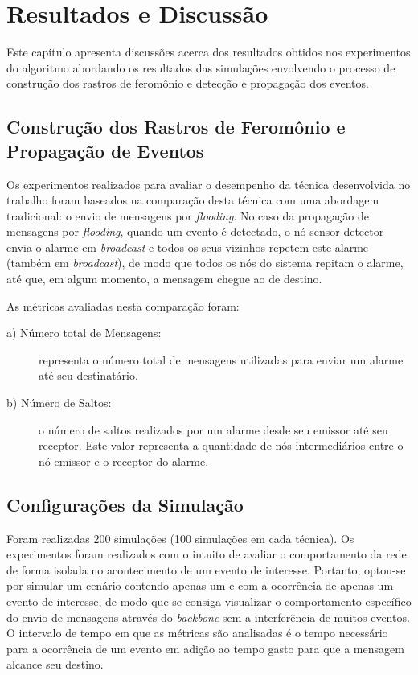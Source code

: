 \newpage\section{Resultados e Discussão}
\label{chap:Resultados}

Este capítulo apresenta discussões acerca dos resultados obtidos nos experimentos do algoritmo abordando os resultados das simulações envolvendo o processo de construção dos rastros de feromônio e detecção e propagação dos eventos. 

\subsection{Construção dos Rastros de Feromônio e Propagação de Eventos}
Os experimentos realizados para avaliar o desempenho da técnica desenvolvida no trabalho foram baseados na comparação desta técnica com uma abordagem tradicional: o envio de mensagens por \emph{flooding}. No caso da propagação de mensagens por \emph{flooding}, quando um evento é detectado, o nó sensor detector envia o alarme em \emph{broadcast} e todos os seus vizinhos repetem este alarme (também em \emph{broadcast}), de modo que todos os nós do sistema repitam o alarme, até que, em algum momento, a mensagem chegue ao \vant de destino.

As métricas avaliadas nesta comparação foram:

\begin{description}
\item[a) Número total de Mensagens: ] representa o número total de mensagens utilizadas para enviar um alarme até seu destinatário.
\item[b) Número de Saltos:] o número de saltos realizados por um alarme desde seu emissor até seu receptor. Este valor representa a quantidade de nós intermediários entre o nó emissor e o \vant receptor do alarme.
\end{description}

\subsection{Configurações da Simulação}
Foram realizadas 200 simulações (100 simulações em cada técnica). Os experimentos foram realizados com o intuito de avaliar o comportamento da rede de forma isolada no acontecimento de um evento de interesse. Portanto, optou-se por simular um cenário contendo apenas um \vant e com a ocorrência de apenas um evento de interesse, de modo que se consiga visualizar o comportamento específico do envio de mensagens através do \emph{backbone} sem a interferência de muitos eventos. O intervalo de tempo em que as métricas são analisadas é o tempo necessário para a ocorrência de um evento em adição ao tempo gasto para que a mensagem alcance seu destino.

